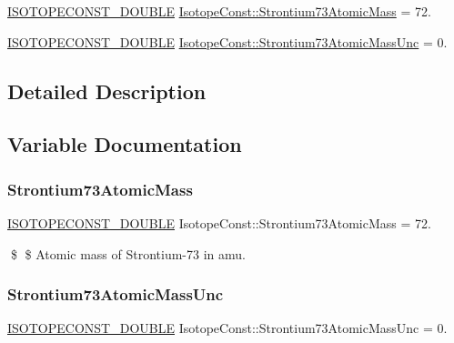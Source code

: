 \begin{DoxyCompactItemize}
\item 
\mbox{\hyperlink{group___isotope_const-_macros_ga8f45a7272ce02c0b4c65c44636ed719a}{I\+S\+O\+T\+O\+P\+E\+C\+O\+N\+S\+T\+\_\+\+D\+O\+U\+B\+LE}} \mbox{\hyperlink{group___isotope_const-_strontium-_sr73_ga93cb0ed13cf4f7b3e8297152dff48cb3}{Isotope\+Const\+::\+Strontium73\+Atomic\+Mass}} = 72.
\item 
\mbox{\hyperlink{group___isotope_const-_macros_ga8f45a7272ce02c0b4c65c44636ed719a}{I\+S\+O\+T\+O\+P\+E\+C\+O\+N\+S\+T\+\_\+\+D\+O\+U\+B\+LE}} \mbox{\hyperlink{group___isotope_const-_strontium-_sr73_gaaeca355b4e12d98a4d5facb5995d8209}{Isotope\+Const\+::\+Strontium73\+Atomic\+Mass\+Unc}} = 0.
\end{DoxyCompactItemize}


\subsection{Detailed Description}


\subsection{Variable Documentation}
\mbox{\label{group___isotope_const-_strontium-_sr73_ga93cb0ed13cf4f7b3e8297152dff48cb3}} 
\subsubsection{\texorpdfstring{Strontium73\+Atomic\+Mass}{Strontium73AtomicMass}}
{\footnotesize\ttfamily \mbox{\hyperlink{group___isotope_const-_macros_ga8f45a7272ce02c0b4c65c44636ed719a}{I\+S\+O\+T\+O\+P\+E\+C\+O\+N\+S\+T\+\_\+\+D\+O\+U\+B\+LE}} Isotope\+Const\+::\+Strontium73\+Atomic\+Mass = 72.}

\$ \$ Atomic mass of Strontium-\/73 in amu. \mbox{\label{group___isotope_const-_strontium-_sr73_gaaeca355b4e12d98a4d5facb5995d8209}} 
\subsubsection{\texorpdfstring{Strontium73\+Atomic\+Mass\+Unc}{Strontium73AtomicMassUnc}}
{\footnotesize\ttfamily \mbox{\hyperlink{group___isotope_const-_macros_ga8f45a7272ce02c0b4c65c44636ed719a}{I\+S\+O\+T\+O\+P\+E\+C\+O\+N\+S\+T\+\_\+\+D\+O\+U\+B\+LE}} Isotope\+Const\+::\+Strontium73\+Atomic\+Mass\+Unc = 0.}

